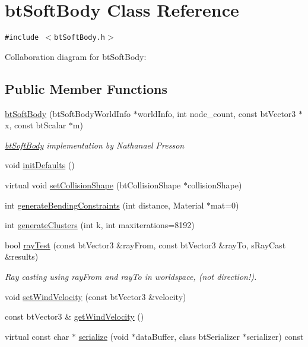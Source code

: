 \hypertarget{classbt_soft_body}{
\section{btSoftBody Class Reference}
\label{classbt_soft_body}
}
{\tt \#include $<$btSoftBody.h$>$}

Collaboration diagram for btSoftBody:\subsection*{Public Member Functions}
\begin{CompactItemize}
\item 
\hypertarget{classbt_soft_body_842480e0f75b82a50f0e5e606e2ac40b}{
\hyperlink{classbt_soft_body_842480e0f75b82a50f0e5e606e2ac40b}{btSoftBody} (btSoftBodyWorldInfo $\ast$worldInfo, int node\_\-count, const btVector3 $\ast$x, const btScalar $\ast$m)}
\label{classbt_soft_body_842480e0f75b82a50f0e5e606e2ac40b}

\begin{CompactList}\small\item\em \hyperlink{classbt_soft_body}{btSoftBody} implementation by Nathanael Presson \item\end{CompactList}\item 
void \hyperlink{classbt_soft_body_e07c09d9c2937897c3690c1a3970bf61}{initDefaults} ()
\item 
virtual void \hyperlink{classbt_soft_body_ced0f5421eeb1491a3fd77bb91e2e5af}{setCollisionShape} (btCollisionShape $\ast$collisionShape)
\item 
int \hyperlink{classbt_soft_body_f31b03f0ff5eecec1ec9eee5a7582d20}{generateBendingConstraints} (int distance, Material $\ast$mat=0)
\item 
int \hyperlink{classbt_soft_body_9915ca0d99dbeb9f39221dab218d5208}{generateClusters} (int k, int maxiterations=8192)
\item 
\hypertarget{classbt_soft_body_3133d790dcff71b8e8a43eb966097485}{
bool \hyperlink{classbt_soft_body_3133d790dcff71b8e8a43eb966097485}{rayTest} (const btVector3 \&rayFrom, const btVector3 \&rayTo, sRayCast \&results)}
\label{classbt_soft_body_3133d790dcff71b8e8a43eb966097485}

\begin{CompactList}\small\item\em Ray casting using rayFrom and rayTo in worldspace, (not direction!). \item\end{CompactList}\item 
void \hyperlink{classbt_soft_body_ee9ac69662731fa96ae2357522972ef9}{setWindVelocity} (const btVector3 \&velocity)
\item 
const btVector3 \& \hyperlink{classbt_soft_body_71de05c3c56952a4d76e09ca9ca9cce0}{getWindVelocity} ()
\item 
\hypertarget{classbt_soft_body_c24b1fbdcc3ed3d26b3dae6380303c77}{
virtual const char $\ast$ \hyperlink{classbt_soft_body_c24b1fbdcc3ed3d26b3dae6380303c77}{serialize} (void $\ast$dataBuffer, class btSerializer $\ast$serializer) const }
\label{classbt_soft_body_c24b1fbdcc3ed3d26b3dae6380303c77}


\end{CompactItemize}
